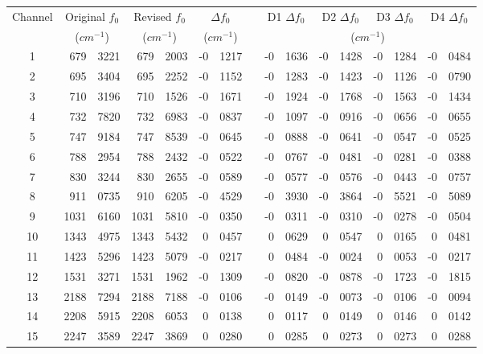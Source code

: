 \begin{table}[htp]
  \centering
  \begin{tabular}{c *{3}{r@{.}l} c *{4}{r@{.}l}}
    \hline
    Channel & \multicolumn{2}{c}{Original $f_0$} & \multicolumn{2}{c}{Revised $f_0$} & \multicolumn{2}{c}{$\Delta f_0$} & & \multicolumn{2}{c}{D1 $\Delta f_0$} & \multicolumn{2}{c}{D2 $\Delta f_0$} & \multicolumn{2}{c}{D3 $\Delta f_0$} & \multicolumn{2}{c}{D4 $\Delta f_0$} \\
            & \multicolumn{2}{c}{($cm^{-1}$)}    & \multicolumn{2}{c}{($cm^{-1}$)}   & \multicolumn{2}{c}{($cm^{-1}$)} & &  \multicolumn{8}{c}{($cm^{-1}$)}\\
    \hline\hline
       1    &  679&3221 &  679&2003 & -0&1217 & & -0&1636 & -0&1428 & -0&1284 & -0&0484 \\
       2    &  695&3404 &  695&2252 & -0&1152 & & -0&1283 & -0&1423 & -0&1126 & -0&0790 \\
       3    &  710&3196 &  710&1526 & -0&1671 & & -0&1924 & -0&1768 & -0&1563 & -0&1434 \\
       4    &  732&7820 &  732&6983 & -0&0837 & & -0&1097 & -0&0916 & -0&0656 & -0&0655 \\
       5    &  747&9184 &  747&8539 & -0&0645 & & -0&0888 & -0&0641 & -0&0547 & -0&0525 \\
       6    &  788&2954 &  788&2432 & -0&0522 & & -0&0767 & -0&0481 & -0&0281 & -0&0388 \\
       7    &  830&3244 &  830&2655 & -0&0589 & & -0&0577 & -0&0576 & -0&0443 & -0&0757 \\
       8    &  911&0735 &  910&6205 & -0&4529 & & -0&3930 & -0&3864 & -0&5521 & -0&5089 \\
       9    & 1031&6160 & 1031&5810 & -0&0350 & & -0&0311 & -0&0310 & -0&0278 & -0&0504 \\
      10    & 1343&4975 & 1343&5432 &  0&0457 & &  0&0629 &  0&0547 &  0&0165 &  0&0481 \\
      11    & 1423&5296 & 1423&5079 & -0&0217 & &  0&0484 & -0&0024 &  0&0053 & -0&0217 \\
      12    & 1531&3271 & 1531&1962 & -0&1309 & & -0&0820 & -0&0878 & -0&1723 & -0&1815 \\
      13    & 2188&7294 & 2188&7188 & -0&0106 & & -0&0149 & -0&0073 & -0&0106 & -0&0094 \\
      14    & 2208&5915 & 2208&6053 &  0&0138 & &  0&0117 &  0&0149 &  0&0146 &  0&0142 \\
      15    & 2247&3589 & 2247&3869 &  0&0280 & &  0&0285 &  0&0273 &  0&0273 &  0&0288 \\

\end{tabular}
\end{table}
